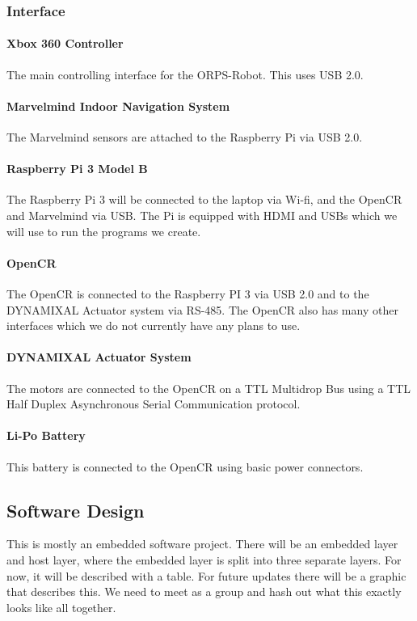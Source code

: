 \documentclass[english,12pt]{article}
\begin{document}
\subsubsection{Interface}
\paragraph{Xbox 360 Controller}
The main controlling interface for the ORPS-Robot. This uses USB 2.0.
\paragraph{Marvelmind Indoor Navigation System}
The Marvelmind sensors are attached to the Raspberry Pi via USB 2.0.
\paragraph{Raspberry Pi 3 Model B}
The Raspberry Pi 3 will be connected to the laptop via Wi-fi, and the OpenCR and Marvelmind via USB.
The Pi is equipped with HDMI and USBs which we will use to run the programs we create.
\paragraph{OpenCR}
The OpenCR is connected to the Raspberry PI 3 via USB 2.0 and to the DYNAMIXAL Actuator system via
RS-485. The OpenCR also has many other interfaces which we do not currently have any plans to use.
\paragraph{DYNAMIXAL Actuator System}
The motors are connected to the OpenCR on a TTL Multidrop Bus using a TTL Half Duplex Asynchronous
Serial Communication protocol.
\paragraph{Li-Po Battery}
This battery is connected to the OpenCR using basic power connectors.
\subsection{Software Design}
This is mostly an embedded software project. There will be an embedded layer and host layer, where
the embedded layer is split into three separate layers. For now, it will be described with a table. For
future updates there will be a graphic that describes this. We need to meet as a group and hash out
what this exactly looks like all together.
\end{document}
